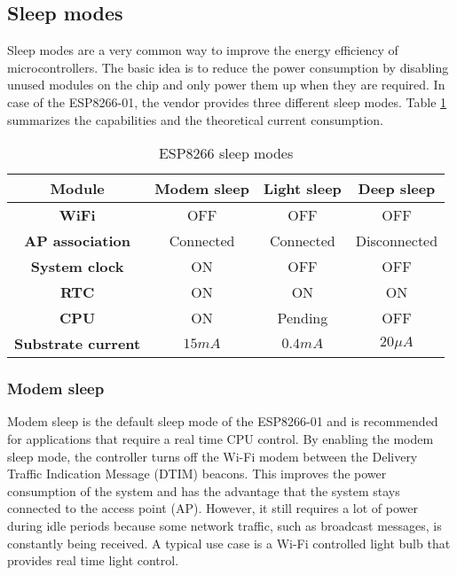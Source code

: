 \subsection{Sleep modes}
Sleep modes are a very common way to improve the energy efficiency of microcontrollers.
The basic idea is to reduce the power consumption by disabling unused modules on the chip and only power them up when they are required.
In case of the ESP8266-01, the vendor provides three different sleep modes. 
Table \ref{tab_sleep_modes} summarizes the capabilities and the theoretical current consumption.
\cite{mesquita_assessing_2018}

\begin{table}[htbp]
\caption{ESP8266 sleep modes}
\begin{center}
\begin{tabular}{|c|c|c|c|}
\hline
\textbf{Module}&\textbf{Modem sleep}&\textbf{Light sleep}&\textbf{Deep sleep}\\
\hline
\textbf{WiFi} & OFF & OFF & OFF\\
\textbf{AP association} & Connected & Connected & Disconnected\\
\textbf{System clock} & ON & OFF & OFF\\
\textbf{RTC} & ON & ON & ON\\
\textbf{CPU} & ON & Pending & OFF\\
\hline
\textbf{Substrate current} & $15mA$ & $0.4mA$ & $20\mu A$\\
\hline
\end{tabular}
\label{tab_sleep_modes}
\end{center}
\end{table}

\subsubsection{Modem sleep} \label{sec:modem_sleep}
Modem sleep is the default sleep mode of the ESP8266-01 and is recommended for applications that require a real time CPU control. \cite{mesquita_assessing_2018}
By enabling the modem sleep mode, the controller turns off the Wi-Fi modem between the Delivery Traffic Indication Message (DTIM) beacons. 
This improves the power consumption of the system and has the advantage that the system stays connected to the access point (AP). 
However, it still requires a lot of power during idle periods because some network traffic, such as broadcast messages, is constantly being received. \cite{gomez_analysing_2011}
A typical use case is a Wi-Fi controlled light bulb that provides real time light control. \cite{espressif_inc_esp8266_2016}

